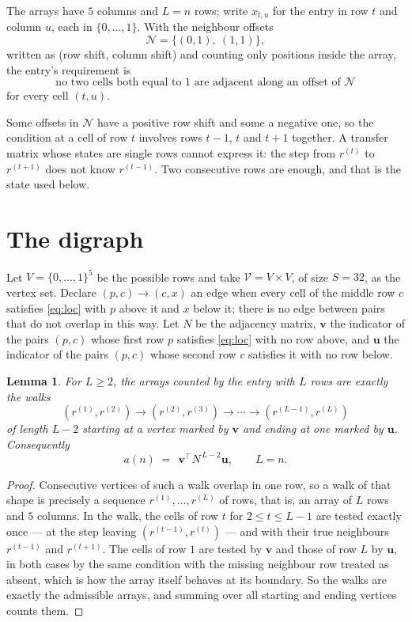 \documentclass[11pt,a4paper]{article}
\theoremstyle{plain}
\newtheorem{lemma}[theorem]{Lemma}
\theoremstyle{definition}
\begin{document}
The arrays have $5$ columns and $L=n$ rows; write $x_{t,u}$ for the entry in
row $t$ and column $u$, each in $\{0,\dots,1\}$. With the neighbour offsets
\[
\mathcal N=\{(0,1),\ (1,1)\},
\]
written as (row shift, column shift) and counting only positions inside the array, the
entry's requirement is
\begin{equation}\label{eq:loc}
\text{no two cells both equal to }1\text{ are adjacent along an offset of }\mathcal N
\end{equation}
for every cell $(t,u)$.

Some offsets in $\mathcal N$ have a positive row shift and some a negative one, so the
condition at a cell of row $t$ involves rows $t-1$, $t$ and $t+1$ together. A transfer
matrix whose states are single rows cannot express it: the step from $r^{(t)}$ to
$r^{(t+1)}$ does not know $r^{(t-1)}$. Two consecutive rows are enough, and that is
the state used below.

\section{The digraph}

Let $V=\{0,\dots,1\}^{5}$ be the possible rows and take
$\mathcal V=V\times V$, of size $S=32$, as the vertex set. Declare $(p,c)\to(c,x)$ an edge
when every cell of the middle row $c$ satisfies \eqref{eq:loc} with $p$ above it and $x$
below it; there is no edge between pairs that do not overlap in this way. Let $N$ be the
adjacency matrix, $\mathbf{v}$ the indicator of the pairs $(p,c)$ whose first row $p$
satisfies \eqref{eq:loc} with no row above, and $\mathbf{u}$ the indicator of
the pairs $(p,c)$ whose second row $c$ satisfies it with no row below.

\begin{lemma}\label{lem:walk}
For $L\ge2$, the arrays counted by the entry with $L$ rows are exactly the walks
\[
(r^{(1)},r^{(2)})\to(r^{(2)},r^{(3)})\to\cdots\to(r^{(L-1)},r^{(L)})
\]
of length $L-2$ starting at a vertex marked by $\mathbf{v}$ and ending at one marked by
$\mathbf{u}$. Consequently
\[
a(n)\;=\;\,\mathbf{v}^{\!\top}N^{\,L-2}\mathbf{u},\qquad L=n .
\]
\end{lemma}

\begin{proof}
Consecutive vertices of such a walk overlap in one row, so a walk of that shape is
precisely a sequence $r^{(1)},\dots,r^{(L)}$ of rows, that is, an array of $L$ rows
and $5$ columns. In the walk, the cells of row $t$ for $2\le t\le L-1$ are tested
exactly once --- at the step leaving $(r^{(t-1)},r^{(t)})$ --- and with their true
neighbours $r^{(t-1)}$ and $r^{(t+1)}$. The cells of row $1$ are tested by
$\mathbf{v}$ and those of row $L$ by $\mathbf{u}$, in both cases by the same condition
with the missing neighbour row treated as absent, which is how the array itself behaves at
its boundary. So the walks are exactly the admissible arrays, and summing over all starting
and ending vertices counts them.
\end{proof}
\end{document}
